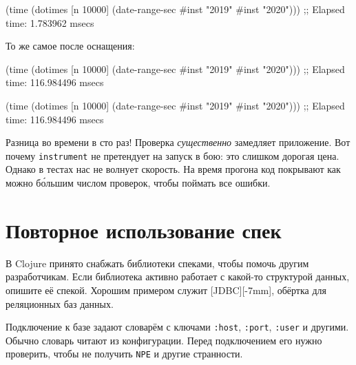 \else

\begin{english}
  \begin{clojure}
(time
 (dotimes [n 10000]
   (date-range-sec #inst "2019" #inst "2020")))
;; Elapsed time: 1.783962 msecs
  \end{clojure}
\end{english}

\fi

\noindent
То же самое после оснащения:

\ifx\DEVICETYPE\MOBILE

\begin{english}
  \begin{clojure}
(time
 (dotimes [n 10000]
   (date-range-sec #inst "2019"
                   #inst "2020")))
;; Elapsed time: 116.984496 msecs
  \end{clojure}
\end{english}

\else

\begin{english}
  \begin{clojure}
(time
 (dotimes [n 10000]
   (date-range-sec #inst "2019" #inst "2020")))
;; Elapsed time: 116.984496 msecs
  \end{clojure}
\end{english}

\fi


Разница во времени в сто раз! Проверка \emph{существенно} замедляет приложение. Вот почему
\verb|instrument| не претендует на запуск в бою: это слишком дорогая
цена. Однако в тестах нас не волнует скорость. На время прогона код покрывают
как можно б\'{о}льшим числом проверок, чтобы поймать все ошибки.

\section{Повторное использование спек}


В Clojure принято снабжать библиотеки спеками, чтобы помочь другим
разработчикам. Если библиотека активно работает с какой-то структурой данных,
опишите её спекой. Хорошим примером служит
[JDBC][-7mm], обёртка для реляционных
баз данных.

Подключение к базе задают словарём с ключами \verb|:host|, \verb|:port|,
\verb|:user| и другими. Обычно словарь читают из конфигурации. Перед
подключением его нужно проверить, чтобы не получить \verb|NPE| и другие
странности.

